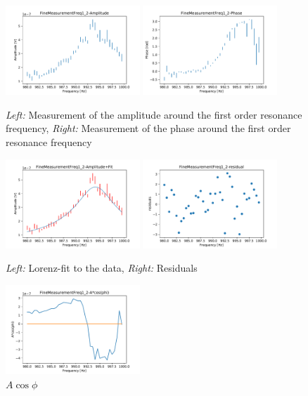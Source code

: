 \begin{figure}[h]
	\centering
	\includegraphics[width=0.45\textwidth]{figures/FineMeasurementFreq1_2amp.pdf}
	\includegraphics[width=0.45\textwidth]{figures/FineMeasurementFreq1_2phase.pdf}
	\caption{\emph{Left:} Measurement of the amplitude around the first order resonance frequency, \emph{Right:} Measurement of the phase around the first order resonance frequency}
	\label{fig4}
\end{figure}
\begin{figure}[h]
	\centering
	\includegraphics[width=0.45\textwidth]{figures/FineMeasurementFreq1_2fit.pdf}
	\includegraphics[width=0.45\textwidth]{figures/FineMeasurementFreq1_2residuals.pdf}
	\caption{\emph{Left:} Lorenz-fit to the data, \emph{Right:} Residuals}
	\label{fig5}
\end{figure}
\begin{figure}[h]
	\centering
	\includegraphics[width=0.45\textwidth]{figures/FineMeasurementFreq1_2acos.pdf}
	\caption{$A \cos \phi$}
	\label{fig6}
\end{figure}

